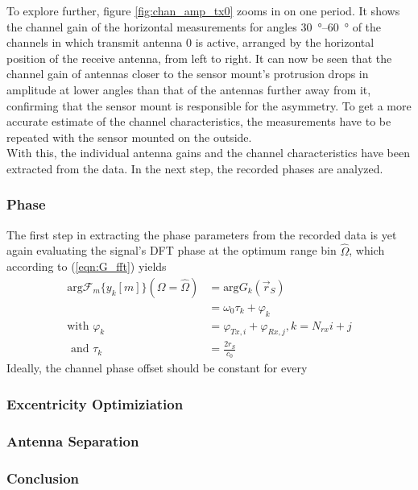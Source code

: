 To explore further, figure \ref{fig:chan_amp_tx0} zooms in on one period.
It shows the channel gain of the horizontal measurements for angles \SIrange{30}{60}{\degree}
of the channels in which transmit antenna 0 is active, arranged by the horizontal position of the receive antenna, from left to right.
It can now be seen that the channel gain of antennas closer to the sensor mount's protrusion drops
in amplitude at lower angles than that of the antennas further away from it,
confirming that the sensor mount is responsible for the asymmetry.
To get a more accurate estimate of the channel characteristics,
the measurements have to be repeated with the sensor mounted on the outside.\\

With this, the individual antenna gains and the channel characteristics have been extracted from the data.
In the next step, the recorded phases are analyzed.

\subsubsection*{Phase}
The first step in extracting the phase parameters from the recorded data is yet again
evaluating the signal's DFT phase at the optimum range bin $\hat \Omega$,
which according to (\ref{eqn:G_fft}) yields
\begin{align}
    \text{arg} \mathcal{F}_m\{y_k[m]\}(\Omega = \hat \Omega) & =    \text{arg}G_k(\vec r_S)                  \\
                                                             & = \omega_0\tau_k + \varphi_k                  \\
    \text{with } \varphi_k                                   & = \varphi_{Tx,i}+\varphi_{Rx,j},  k=N_{rx}i+j \\
    \text{ and } \tau_k                                      & = \frac{2r_S}{c_0}
\end{align}
Ideally, the channel phase offset should be constant for every


\subsubsection*{Excentricity Optimiziation}

\subsubsection*{Antenna Separation}

\subsubsection*{Conclusion}